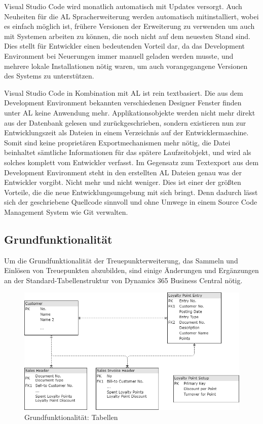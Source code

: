 Visual Studio Code wird monatlich automatisch mit Updates versorgt. Auch Neuheiten für die AL Spracherweiterung werden automatisch mitinstalliert, wobei es einfach möglich ist, frühere Versionen der Erweiterung zu verwenden um auch mit Systemen arbeiten zu können, die noch nicht auf dem neuesten Stand sind. Dies stellt für Entwickler einen bedeutenden Vorteil dar, da das Development Environment bei Neuerungen immer manuell geladen werden musste, und mehrere lokale Installationen nötig waren, um auch vorangegangene Versionen des Systems zu unterstützen.
\linebreak

Visual Studio Code in Kombination mit AL ist rein textbasiert. Die aus dem Development Environment bekannten verschiedenen Designer Fenster finden unter AL keine Anwendung mehr. Applikationsobjekte werden nicht mehr direkt aus der Datenbank gelesen und zurückgeschrieben, sondern existieren nun zur Entwicklungszeit als Dateien in einem Verzeichnis auf der Entwicklermaschine. Somit sind keine proprietären Exportmechanismen mehr nötig, die Datei beinhaltet sämtliche Informationen für das spätere Laufzeitobjekt, und wird als solches komplett vom Entwickler verfasst. Im Gegensatz zum Textexport aus dem Development Environment steht in den erstellten AL Dateien genau was der Entwickler vorgibt. Nicht mehr und nicht weniger. Dies ist einer der größten Vorteile, die die neue Entwicklungsumgebung mit sich bringt. Denn dadurch lässt sich der geschriebene Quellcode sinnvoll und ohne Umwege in einem Source Code Management System wie Git verwalten.


\subsection{Grundfunktionalität}
Um die Grundfunktionalität der Treuepunkterweiterung, das Sammeln und Einlösen von Treuepunkten abzubilden, sind einige Änderungen und Ergänzungen an der Standard-Tabellenstruktur von Dynamics 365 Business Central nötig. 

\pagebreak
\begin{figure}[h]
	\centering
	\includegraphics[width=130mm]{images/Tables}
	\caption{Grundfunktionalität: Tabellen}
	\label{fig:Tables}
\end{figure}

